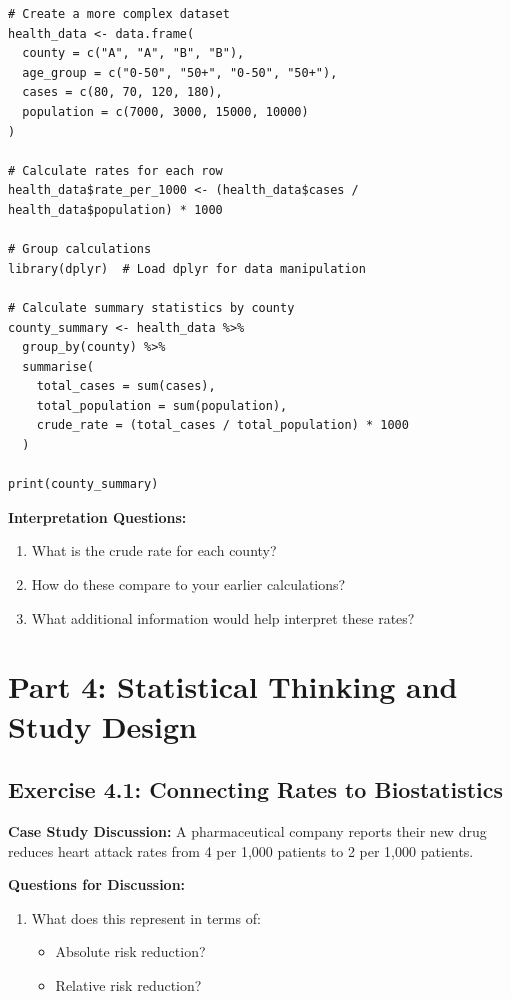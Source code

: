 \documentclass[11pt]{article}
\begin{document}
\begin{lstlisting}
# Create a more complex dataset
health_data <- data.frame(
  county = c("A", "A", "B", "B"),
  age_group = c("0-50", "50+", "0-50", "50+"),
  cases = c(80, 70, 120, 180),
  population = c(7000, 3000, 15000, 10000)
)

# Calculate rates for each row
health_data$rate_per_1000 <- (health_data$cases / health_data$population) * 1000

# Group calculations
library(dplyr)  # Load dplyr for data manipulation

# Calculate summary statistics by county
county_summary <- health_data %>%
  group_by(county) %>%
  summarise(
    total_cases = sum(cases),
    total_population = sum(population),
    crude_rate = (total_cases / total_population) * 1000
  )

print(county_summary)
\end{lstlisting}

\textbf{Interpretation Questions:}
\begin{enumerate}
\item What is the crude rate for each county?
\item How do these compare to your earlier calculations?
\item What additional information would help interpret these rates?
\end{enumerate}

\section{Part 4: Statistical Thinking and Study Design}

\subsection{Exercise 4.1: Connecting Rates to Biostatistics}

\textbf{Case Study Discussion:} A pharmaceutical company reports their new drug reduces heart attack rates from 4 per 1,000 patients to 2 per 1,000 patients.

\textbf{Questions for Discussion:}
\begin{enumerate}
\item What does this represent in terms of:
\begin{itemize}
\item Absolute risk reduction?
\item Relative risk reduction?
\end{itemize}
\end{enumerate}
\end{document}
